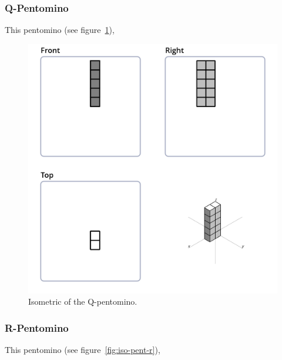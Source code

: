 \subsubsection{Q-Pentomino}
This pentomino (see figure~\ref{fig:iso-pent-q}),


\begin{figure}
	\centering
	\includegraphics[scale=0.3]{iso_diagrams/o.png}
	\caption{Isometric of the Q-pentomino.}
  \label{fig:iso-pent-q}
\end{figure}
\subsubsection{R-Pentomino}
This pentomino (see figure~\ref{fig:iso-pent-r}),


